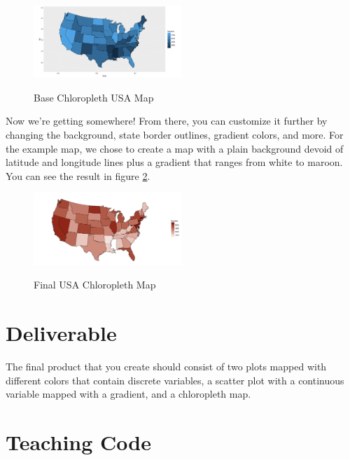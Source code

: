 \begin{figure}[htbp!]
   \centering
      \caption{Base Chloropleth USA Map}
   \includegraphics[width=0.5\textwidth]{pictures/ggplot2/OGUSAmap.png} 
   \label{fig:OGUSAmap}
\end{figure} 

Now we're getting somewhere! From there, you can customize it further by changing the background, state border outlines, gradient colors, and more.
For the example map, we chose to create a map with a plain background devoid of latitude and longitude lines plus a gradient that ranges from white to maroon.
You can see the result in figure \ref{fig:whitemaroonUSAmap}.

\begin{figure}[htbp!]
   \centering
      \caption{Final USA Chloropleth Map}
   \includegraphics[width=0.5\textwidth]{pictures/ggplot2/whitemaroonUSAmap.png} 
   \label{fig:whitemaroonUSAmap}
\end{figure} 

 
\section{Deliverable}

The final product that you create should consist of two plots mapped with different colors that contain discrete variables, a scatter plot with a continuous variable mapped with a gradient, and a chloropleth map.

\section{Teaching Code}

